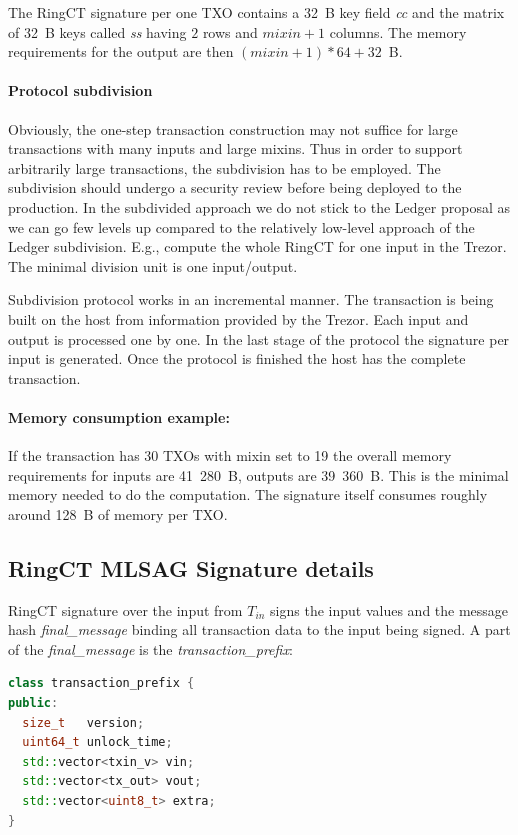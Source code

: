 \documentclass[]{article}
\begin{document}
The RingCT signature per one TXO contains a 32~B key field \emph{cc} and the matrix of 32~B keys called \emph{ss} having $2$ rows and $mixin + 1$ columns. The memory requirements for the output are then $(mixin + 1) * 64 + 32$~B.

\paragraph{Protocol subdivision}

Obviously, the one-step transaction construction may not suffice for large transactions with many inputs and large mixins. Thus in order to support arbitrarily large transactions, the subdivision has to be employed. The subdivision should undergo a security review before being deployed to the production. In the subdivided approach we do not stick to the Ledger proposal as we can go few levels up compared to the relatively low-level approach of the Ledger subdivision. E.g., compute the whole RingCT for one input in the Trezor. The minimal division unit is one input/output. 

Subdivision protocol works in an incremental manner. The transaction is being built on the host from information provided by the Trezor. Each input and output is processed one by one. In the last stage of the protocol the signature per input is generated. Once the protocol is finished the host has the complete transaction.

\paragraph{Memory consumption example:}
If the transaction has 30 TXOs with mixin set to 19 the overall memory requirements for inputs are 41~280~B, outputs are 39~360~B. This is the minimal memory needed to do the computation. The signature itself consumes roughly around 128~B of memory per TXO.

\subsection{RingCT MLSAG Signature details}

RingCT signature over the input from $T_{in}$ signs the input values and the message hash \emph{final\_message} binding all transaction data to the input being signed. A part of the \emph{final\_message} is the \emph{transaction\_prefix}:

\begin{lstlisting}[language=c++]
class transaction_prefix {
public:
  size_t   version;
  uint64_t unlock_time;  
  std::vector<txin_v> vin;
  std::vector<tx_out> vout;
  std::vector<uint8_t> extra;
}
\end{lstlisting}
\end{document}
